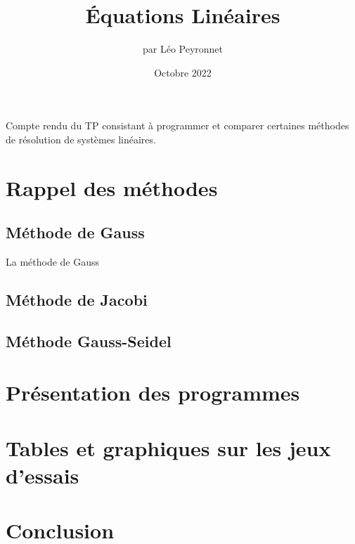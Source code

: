 \documentclass[french]{article}
\author{par Léo Peyronnet}
\title{Équations Linéaires}
\date{Octobre 2022}
\begin{document}
\maketitle
Compte rendu du TP consistant à programmer et comparer certaines méthodes de résolution de systèmes linéaires.
\section{Rappel des méthodes}
\subsection{Méthode de Gauss}
La méthode de Gauss
\subsection{Méthode de Jacobi}
\subsection{Méthode Gauss-Seidel}
\section{Présentation des programmes}
\section{Tables et graphiques sur les jeux d'essais}
\section{Conclusion}
\end{document}
